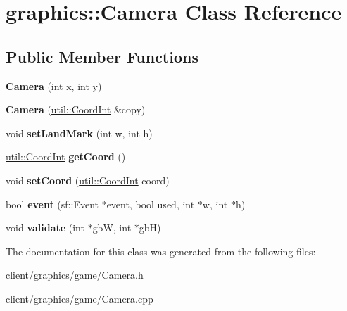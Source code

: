 \hypertarget{classgraphics_1_1_camera}{\section{graphics\-:\-:Camera Class Reference}
\label{classgraphics_1_1_camera}
}
\subsection*{Public Member Functions}
\begin{DoxyCompactItemize}
\item 
\hypertarget{classgraphics_1_1_camera_a3d3bc3f550caf24a391c831275f8bdad}{{\bfseries Camera} (int x, int y)}\label{classgraphics_1_1_camera_a3d3bc3f550caf24a391c831275f8bdad}

\item 
\hypertarget{classgraphics_1_1_camera_a09174bbf446378e6b33c425c3dc1a8ea}{{\bfseries Camera} (\hyperlink{classutil_1_1_coordinates}{util\-::\-Coord\-Int} \&copy)}\label{classgraphics_1_1_camera_a09174bbf446378e6b33c425c3dc1a8ea}

\item 
\hypertarget{classgraphics_1_1_camera_af4af675e5cc59e105355f586e4727f1e}{void {\bfseries set\-Land\-Mark} (int w, int h)}\label{classgraphics_1_1_camera_af4af675e5cc59e105355f586e4727f1e}

\item 
\hypertarget{classgraphics_1_1_camera_aca0100ef100b66f8903447b2263d3b33}{\hyperlink{classutil_1_1_coordinates}{util\-::\-Coord\-Int} {\bfseries get\-Coord} ()}\label{classgraphics_1_1_camera_aca0100ef100b66f8903447b2263d3b33}

\item 
\hypertarget{classgraphics_1_1_camera_a403146df2ca19edaab298a0774f53e77}{void {\bfseries set\-Coord} (\hyperlink{classutil_1_1_coordinates}{util\-::\-Coord\-Int} coord)}\label{classgraphics_1_1_camera_a403146df2ca19edaab298a0774f53e77}

\item 
\hypertarget{classgraphics_1_1_camera_a4b9a31909ba688d3ec6e5c61bad306bf}{bool {\bfseries event} (sf\-::\-Event $\ast$event, bool used, int $\ast$w, int $\ast$h)}\label{classgraphics_1_1_camera_a4b9a31909ba688d3ec6e5c61bad306bf}

\item 
\hypertarget{classgraphics_1_1_camera_a37d84f71584df4bcf2d409d657a28b58}{void {\bfseries validate} (int $\ast$gb\-W, int $\ast$gb\-H)}\label{classgraphics_1_1_camera_a37d84f71584df4bcf2d409d657a28b58}

\end{DoxyCompactItemize}


The documentation for this class was generated from the following files\-:\begin{DoxyCompactItemize}
\item 
client/graphics/game/Camera.\-h\item 
client/graphics/game/Camera.\-cpp\end{DoxyCompactItemize}
